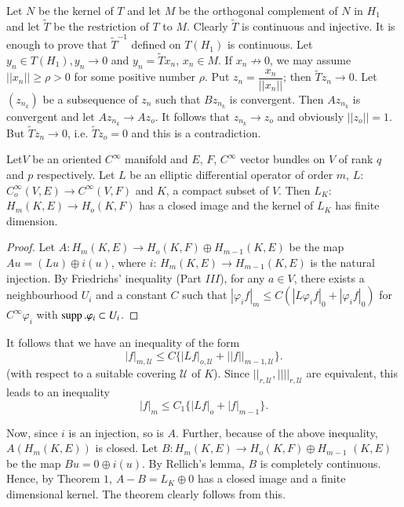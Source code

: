 Let $N$ be the kernel of $T$ and let $M$ be the orthogonal complement
of $N$ in $H_1$ and let $\widetilde{T}$ be the restriction of $T$ to
$M$. Clearly $\widetilde{T}$ is continuous and injective. It is enough to
prove that $\widetilde{T}^{-1}$ defined on $T(H_1)$ is continuous. Let
$y_n \in T (H_1), y_n \to 0$ and $y_n = \widetilde{T} x_n$, $x_n \in M$. If $x_n
\not\to  0$, we may assume $|| x_n || \ge \rho > 0$ for some positive
number $\rho$. Put $z_n = \dfrac{x_n}{||x_n||}$; then $\widetilde{T} z_n
\to 0$. Let $(z_{n_k})$ be a subsequence of $z_n$ such that
$Bz_{n_{k}}$ is convergent. Then $Az_{n_{k}}$ is convergent and let
$Az_{n_{k}} \to Az_o$. It follows that $z_{n_{k}} \to z_o$ and
obviously $|| z_o || =1$. But $\widetilde{T} z_n \to 0$, i.e. $\widetilde{T}
z_o = 0$ and this is a contradiction. 

\begin{theorem}\label{chap3:sec9:thm2} %
  Let\pageoriginale $V$ be an oriented $C^{\infty}$ manifold  and $E$, $F$,
  $C^{\infty}$ vector bundles on $V$ of rank $q$ and $p$
  respectively. Let $L$ be an elliptic differential operator of order
  $m$, $L$: $C^{\infty}_{o} (V, E) \to C^{\infty} (V,F)$ and $K$, a
  compact subset of $V$. Then $L_K$: $H_m (K, E) \to H_o (K, F)$ has a
  closed image  and the kernel of $L_K$ has finite dimension. 
\end{theorem}

\begin{proof}
  Let $A: H_m (K, E) \to H_o (K, F) \oplus H_{m-1} (K,E)$ be the map
  $Au = (Lu) \oplus i (u)$, where $i$: $H_m (K, E) \to H_{m-1} (K, E)$
  is the natural injection. By Friedrichs' inequality (Part $III$),
  for any $a \in V$, there exists a neighbourhood $U_i$ and a constant
  $C$ such that $|\varphi_i f|_m \leq C (|L \varphi_i f| _0 + |
  \varphi_i f|_0)$ for $C^{\infty} \varphi_i$ with $\operatorname{supp}. \varphi _i
  \subset U_i$. 
\end{proof}

It follows that we have an inequality of the form
$$
|f|_{m , \mathscr{U}} \leq C \{ |Lf|_{o, \mathscr{U}} + || f ||_{m-1,
  \mathscr{U}}\}. 
$$
(with respect to a suitable covering $\mathcal{U}$ of $K$). Since
$||_{r, \mathcal{U}}, || ||_{r, \mathcal{U}}$ are equivalent, this
leads to an inequality 
$$
|f|_m \leq C_1 \{ |Lf |_o + |f|_{m-1} \}.
$$

Now, since $i$ is an injection, so is $A$. Further, because of the
above inequality, $A (H_m (K, E))$ is closed. Let $B: H_m (K, E) \to
H_o (K, F) \oplus H_{m-1}$ $(K, E)$ be the map $Bu = 0 \oplus i(u)$. By
Rellich's lemma, $B$ is completely continuous. Hence, by Theorem $1$,
$A- B = L_K \oplus 0$ has a closed image and a finite dimensional
kernel. The theorem clearly follows from this. 

